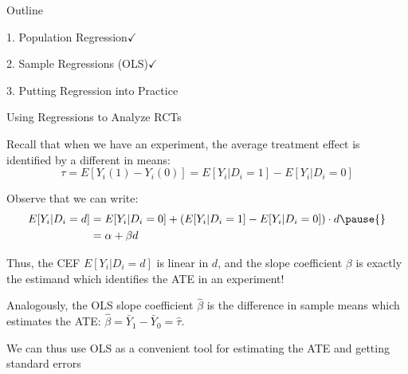 \documentclass[11pt,english,handout]{beamer}
\newenvironment{wideitemize}{\itemize\addtolength{\itemsep}{10pt}}{\enditemize}
\begin{document}
\begin{frame}{Outline}

\textcolor{red!75!green!50!blue!25!gray}{1. Population Regression}$\checkmark$
\vspace{0.8cm}

\textcolor{red!75!green!50!blue!25!gray}{2. Sample Regressions (OLS)}$\checkmark$
\vspace{0.8cm}

3. Putting Regression into Practice

\end{frame}
		
\begin{frame}{Using Regressions to Analyze RCTs}
	\begin{wideitemize}
		\item 
		Recall that when we have an experiment, the average treatment effect is identified by a different in means:
		$$\tau = E[Y_i(1)-Y_i(0)]= E[Y_i |D_i =1] - E[Y_i | D_i =0 ]$$
		
		\pause
		\item
		Observe that we can write:
		\begin{align*}
		E[Y_i | D_i =d] &= E[Y_i | D_i =0] + \left( E[Y_i | D_i = 1] - E[Y_i | D_i =0]  \right) \cdot d \pause{} \\
		&= \alpha + \beta d
		\end{align*}
		
		\pause
		\item
		Thus, the CEF $E[Y_i | D_i = d]$ is linear in $d$, and the slope coefficient $\beta$ is exactly the estimand which identifies the ATE in an experiment!
		
		\pause
		\item
		Analogously, the OLS slope coefficient $\hat\beta$ is the difference in sample means which estimates the ATE: $\hat\beta = \bar{Y}_1 - \bar{Y}_0 = \hat\tau$.
		
		\pause
		\item
		We can thus use OLS as a convenient tool for estimating the ATE and getting standard errors		
	\end{wideitemize}
	
\end{frame}		
\end{document}
